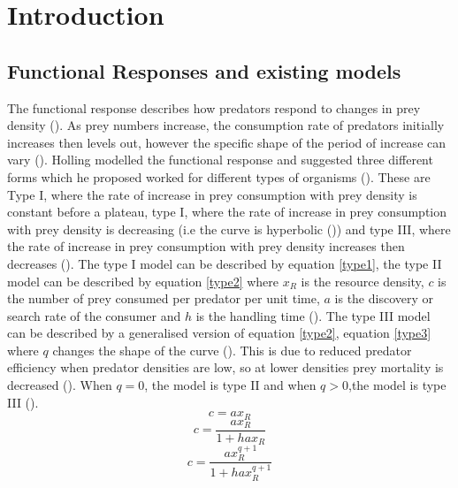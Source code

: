 \documentclass{article}
\begin{document}
\section{Introduction}
\subsection{Functional Responses and existing models}
The functional response describes how predators respond to changes in prey density (\cite{hollingsawfly1959,Solomon1949}). As prey numbers increase, the consumption rate of predators initially increases then levels out, however the specific shape of the period of increase can vary (\cite{hollingsawfly1959}). Holling modelled the functional response and suggested three different forms which he proposed worked for different types of organisms (\cite{hollingsawfly1959}). These are Type I, where the rate of increase in prey consumption with prey density is constant before a plateau, type I, where the rate of increase in prey consumption with prey density is decreasing (i.e the curve is hyperbolic (\cite{Jeschke2002PredatorPrey})) and type III, where the  rate of increase in prey consumption with prey density increases then decreases (\cite{hollingsawfly1959}). The type I model can be described by equation \ref{type1}, the type II model can be described by equation \ref{type2} where $x_R$ is the resource density, $c$ is the number of prey consumed per predator per unit time, $a$ is the discovery or search rate of the consumer and $h$ is the handling time (\cite{Dawes2013,Holling1959}). The type III model can be described by a generalised version of equation \ref{type2}, equation \ref{type3} where $q$ changes the shape of the curve (\cite{Dawes2013}). This is due to reduced predator efficiency when predator densities are low, so at lower densities prey mortality is decreased (\cite{Taylor2003EffectAmericanus,Hassell1978TheSystems.}). 
When $q=0$, the model is type II and when $q>0$,the model is type III (\cite{Dawes2013}). \\
\begin{equation}\label{type1}
    c=ax_R
\end{equation}
\begin{equation}\label{type2}
c=\frac{ax_R}{1+hax_R}
\end{equation}
\begin{equation}\label{type3}
c=\frac{ax_R^{q+1}}{1+hax_R^{q+1}}
\end{equation}
\end{document}
